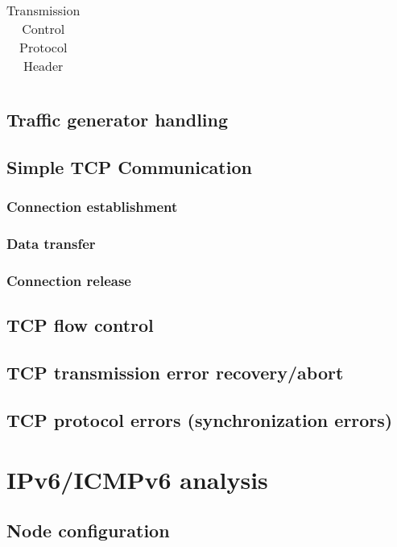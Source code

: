 \begin{table}[H]
\begin{tabular}{|c|c|c|c|c|c|c|c|c|c|c|c|c|}
	\end{tabular}
	\caption{Transmission Control Protocol Header}
\end{table}

\section{Traffic generator handling}

\section{Simple TCP Communication}
\subsection{Connection establishment}
\subsection{Data transfer}
\subsection{Connection release}

\section{TCP flow control}

\section{TCP transmission error recovery/abort}

\section{TCP protocol errors (synchronization errors)}

\chapter{IPv6/ICMPv6 analysis}
\label{ipv6}
\section{Node configuration}
